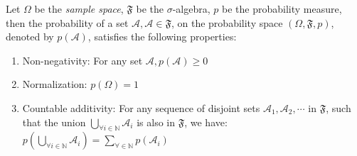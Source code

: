 \begin{defn}\label{defn:probability_measure}
Let $\Omega$ be the \textit{sample space}, $\mathfrak{F}$ be the $\sigma$-algebra, $ p$ be the probability measure, then the probability of a set $\mathscr{A}, \mathscr{A}\in\mathfrak{F}$, on the probability space $(\Omega,\mathfrak{F}, p)$, denoted by $ p(\mathscr{A})$, satisfies the following properties:
\begin{enumerate}
    \item Non-negativity: For any set $\mathscr{A},  p(\mathscr{A})\geq 0$
    \item Normalization: $ p(\Omega)=1$
    \item Countable additivity: For any sequence of disjoint sets $\mathscr{A}_1,\mathscr{A}_2,\cdots$ in $\mathfrak{F}$, such that the union $\bigcup_{\forall i \in\mathbb{N}}\mathscr{A}_i$ is also in $\mathfrak{F}$, we have: $ p\left(\displaystyle\bigcup_{\forall i\in\mathbb{N}}\mathscr{A}_i\right)=\displaystyle\sum_{\forall \in\mathbb{N}} p(\mathscr{A}_i)$
\end{enumerate}

\end{defn}

